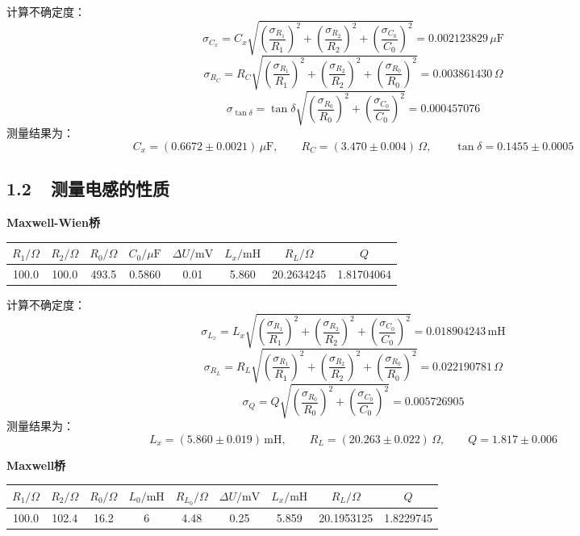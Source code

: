 \documentclass[a4paper,fontset=windows]{ctexart}
\begin{document}
    计算不确定度：
    \[
    \sigma_{C_x} = C_x\sqrt{\left(\frac{\sigma_{R_1}}{R_1}\right)^2 + \left(\frac{\sigma_{R_2}}{R_2}\right)^2 + \left(\frac{\sigma_{C_0}}{C_0}\right)^2} = 0.002123829\,\mu\mathrm{F}
    \]
    \[
    \sigma_{R_C} = R_C\sqrt{\left(\frac{\sigma_{R_1}}{R_1}\right)^2 + \left(\frac{\sigma_{R_2}}{R_2}\right)^2 + \left(\frac{\sigma_{R_0}}{R_0}\right)^2} = 0.003861430\,\Omega
    \]
    \[
    \sigma_{\tan\delta} = \tan\delta\sqrt{\left(\frac{\sigma_{R_0}}{R_0}\right)^2 + \left(\frac{\sigma_{C_0}}{C_0}\right)^2} = 0.000457076
    \]
    测量结果为：
    \[
    C_x = (0.6672\pm0.0021)\,\mu\mathrm{F},\qquad
    R_C = (3.470\pm0.004)\,\Omega,\qquad
    \tan\delta = 0.1455\pm0.0005
    \]

    \subsection*{1.2\ \ 测量电感的性质}

    \textbf{Maxwell-Wien桥}

    \begin{center}
    \begin{tabular}{|c|c|c|c|c|c|c|c|}
        \hline
        $R_1/\Omega$ & $R_2/\Omega$ & $R_0/\Omega$ & $C_0/\mu\mathrm{F}$ & $\Delta U/\mathrm{mV}$ & $L_x/\mathrm{mH}$ & $R_L/\Omega$ & $Q$ \\
        \hline
        100.0 & 100.0 & 493.5 & 0.5860 & 0.01 & 5.860 & 20.2634245 & 1.81704064 \\
        \hline
    \end{tabular}
    \end{center}

    计算不确定度：
    \[
    \sigma_{L_x} = L_x\sqrt{\left(\frac{\sigma_{R_1}}{R_1}\right)^2 + \left(\frac{\sigma_{R_2}}{R_2}\right)^2 + \left(\frac{\sigma_{C_0}}{C_0}\right)^2} = 0.018904243\,\mathrm{mH}
    \]
    \[
    \sigma_{R_L} = R_L\sqrt{\left(\frac{\sigma_{R_1}}{R_1}\right)^2 + \left(\frac{\sigma_{R_2}}{R_2}\right)^2 + \left(\frac{\sigma_{R_0}}{R_0}\right)^2} = 0.022190781\,\Omega
    \]
    \[
    \sigma_{Q} = Q\sqrt{\left(\frac{\sigma_{R_0}}{R_0}\right)^2 + \left(\frac{\sigma_{C_0}}{C_0}\right)^2} = 0.005726905
    \]
    测量结果为：
    \[
    L_x = (5.860\pm0.019)\,\mathrm{mH},\qquad
    R_L = (20.263\pm0.022)\,\Omega,\qquad
    Q = 1.817\pm0.006
    \]

    \textbf{Maxwell桥}

    \begin{center}
    \begin{tabular}{|c|c|c|c|c|c|c|c|c|}
        \hline
        $R_1/\Omega$ & $R_2/\Omega$ & $R_0/\Omega$ & $L_0/\mathrm{mH}$ & $R_{L_0}/\Omega$ & $\Delta U/\mathrm{mV}$ & $L_x/\mathrm{mH}$ & $R_L/\Omega$ & $Q$ \\
        \hline
        100.0 & 102.4 & 16.2 & 6 & 4.48 & 0.25 & 5.859 & 20.1953125 & 1.8229745 \\
        \hline
    \end{tabular}
    \end{center}
\end{document}
